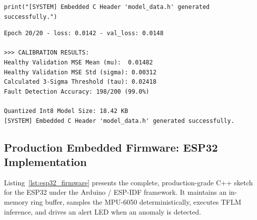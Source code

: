 \begin{lstlisting}[style=pythonstyle, caption={Complete Autoencoder Training, Threshold Calibration, and Int8 Quantization Pipeline.}, label={lst:autoencoder_pipeline}]
print("[SYSTEM] Embedded C Header 'model_data.h' generated successfully.")
\end{lstlisting}

\begin{lstlisting}[style=outputstyle, caption={Terminal output and model quantization metrics.}]
Epoch 20/20 - loss: 0.0142 - val_loss: 0.0148

>>> CALIBRATION RESULTS:
Healthy Validation MSE Mean (mu):  0.01482
Healthy Validation MSE Std (sigma): 0.00312
Calculated 3-Sigma Threshold (tau): 0.02418
Fault Detection Accuracy: 198/200 (99.0%)

Quantized Int8 Model Size: 18.42 KB
[SYSTEM] Embedded C Header 'model_data.h' generated successfully.
\end{lstlisting}

\subsection{Production Embedded Firmware: ESP32 Implementation}\label{subsec:p3_embedded_cpp}

Listing~\ref{lst:esp32_firmware} presents the complete, production-grade C++ sketch for the ESP32 under the Arduino / ESP-IDF framework. It maintains an in-memory ring buffer, samples the MPU-6050 deterministically, executes TFLM inference, and drives an alert LED when an anomaly is detected.

